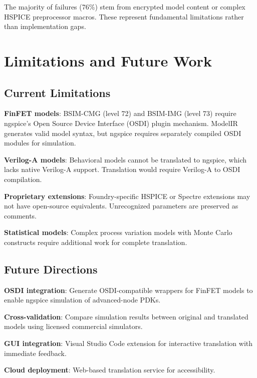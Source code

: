 \documentclass[conference]{IEEEtran}
\begin{document}
The majority of failures (76\%) stem from encrypted model content or complex HSPICE preprocessor macros. These represent fundamental limitations rather than implementation gaps.

\section{Limitations and Future Work}
\label{sec:limitations}

\subsection{Current Limitations}

\textbf{FinFET models}: BSIM-CMG (level 72) and BSIM-IMG (level 73) require ngspice's Open Source Device Interface (OSDI) plugin mechanism. ModelIR generates valid model syntax, but ngspice requires separately compiled OSDI modules for simulation.

\textbf{Verilog-A models}: Behavioral models cannot be translated to ngspice, which lacks native Verilog-A support. Translation would require Verilog-A to OSDI compilation.

\textbf{Proprietary extensions}: Foundry-specific HSPICE or Spectre extensions may not have open-source equivalents. Unrecognized parameters are preserved as comments.

\textbf{Statistical models}: Complex process variation models with Monte Carlo constructs require additional work for complete translation.

\subsection{Future Directions}

\textbf{OSDI integration}: Generate OSDI-compatible wrappers for FinFET models to enable ngspice simulation of advanced-node PDKs.

\textbf{Cross-validation}: Compare simulation results between original and translated models using licensed commercial simulators.

\textbf{GUI integration}: Visual Studio Code extension for interactive translation with immediate feedback.

\textbf{Cloud deployment}: Web-based translation service for accessibility.
\end{document}
